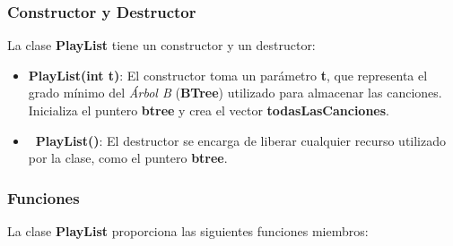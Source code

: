 \documentclass[corference]{IEEEtran}
\begin{document}
\begin{flushleft}
            \subsubsection{Constructor y Destructor}
            
                \noindent\hspace*{4em}La clase \textbf{PlayList} tiene un constructor y un destructor:
                
                \begin{itemize}[left=4em]
                    \item \textbf{PlayList(int t)}: El constructor toma un parámetro \textbf{t}, que representa el grado mínimo del \textit{Árbol B} (\textbf{BTree}) utilizado para almacenar las canciones. Inicializa el puntero \textbf{btree} y crea el vector \textbf{todasLasCanciones}.
                    \item \textbf{~PlayList()}: El destructor se encarga de liberar cualquier recurso utilizado por la clase, como el puntero \textbf{btree}.
                \end{itemize}
            
            \subsubsection{Funciones}
            
                \noindent\hspace*{4em}La clase \textbf{PlayList} proporciona las siguientes funciones miembros:
                

\end{flushleft}
\end{document}
